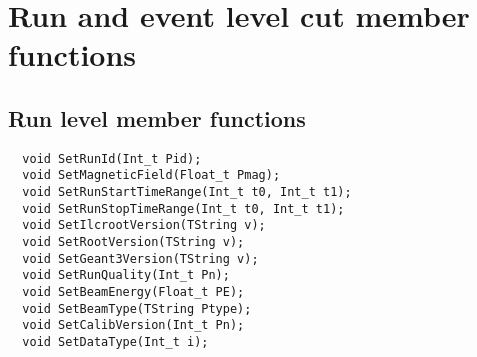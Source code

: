 \section{Run and event level cut member functions}
\label{App:ObjectCuts}
\subsection{Run level member functions}
{\ttfamily \noindent
\begin{verbatim}
  void SetRunId(Int_t Pid);
  void SetMagneticField(Float_t Pmag);
  void SetRunStartTimeRange(Int_t t0, Int_t t1);
  void SetRunStopTimeRange(Int_t t0, Int_t t1);
  void SetIlcrootVersion(TString v);
  void SetRootVersion(TString v);
  void SetGeant3Version(TString v);
  void SetRunQuality(Int_t Pn);
  void SetBeamEnergy(Float_t PE);
  void SetBeamType(TString Ptype);
  void SetCalibVersion(Int_t Pn);
  void SetDataType(Int_t i);
\end{verbatim}
}
